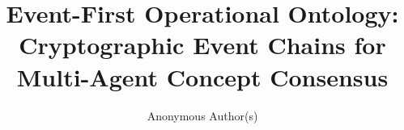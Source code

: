 \documentclass[runningheads]{llncs}
\begin{document}
\title{Event-First Operational Ontology:\\Cryptographic Event Chains for Multi-Agent Concept Consensus}

\author{Anonymous Author(s)}

\maketitle













\appendix


\end{document}
